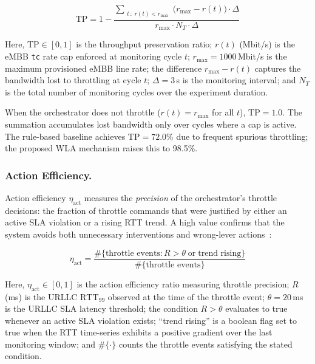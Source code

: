 \documentclass[12pt]{article}
\begin{document}
\begin{equation}
  \text{TP}
    = 1 - \frac{\displaystyle
                \sum_{\substack{t\,:\; r(t) < r_\text{max}}}
                \bigl(r_\text{max} - r(t)\bigr)\cdot\Delta}
               {r_\text{max} \cdot N_T \cdot \Delta}
  \label{eq:tp}
\end{equation}

\noindent Here, $\text{TP} \in [0,1]$ is the throughput preservation
ratio; $r(t)$ (Mbit/s) is the eMBB \texttt{tc} rate cap enforced
at monitoring cycle $t$; $r_\text{max} = 1000$\,Mbit/s is the maximum
provisioned eMBB line rate; the difference $r_\text{max} - r(t)$
captures the bandwidth lost to throttling at cycle $t$; $\Delta = 3$\,s
is the monitoring interval; and $N_T$ is the total number of monitoring
cycles over the experiment duration.

\noindent When the orchestrator does not throttle ($r(t) = r_\text{max}$
for all $t$), $\text{TP} = 1.0$. The summation accumulates lost bandwidth
only over cycles where a cap is active. The rule-based baseline achieves
$\text{TP} = 72.0\%$ due to frequent spurious throttling; the proposed
WLA mechanism raises this to 98.5\%.

\subsubsection{Action Efficiency.}
Action efficiency $\eta_\text{act}$ measures the \emph{precision} of the
orchestrator's throttle decisions: the fraction of throttle commands that
were justified by either an active SLA violation or a rising RTT trend.
A high value confirms that the system avoids both unnecessary interventions
and wrong-lever actions~\cite{zhou2021predict}:

\begin{equation}
  \eta_\text{act}
    = \frac{\#\bigl\{\text{throttle events} :
             R > \theta \;\text{or}\; \text{trend rising}\bigr\}}
           {\#\bigl\{\text{throttle events}\bigr\}}
  \label{eq:eff}
\end{equation}

\noindent Here, $\eta_\text{act} \in [0,1]$ is the action efficiency
ratio measuring throttle precision; $R$ (ms) is the URLLC
$\text{RTT}_{99}$ observed at the time of the throttle event;
$\theta = 20$\,ms is the URLLC SLA latency threshold; the condition
$R > \theta$ evaluates to true whenever an active SLA violation exists;
``trend rising'' is a boolean flag set to true when the RTT time-series
exhibits a positive gradient over the last monitoring window; and
$\#\{\cdot\}$ counts the throttle events satisfying the stated
condition.
\end{document}
